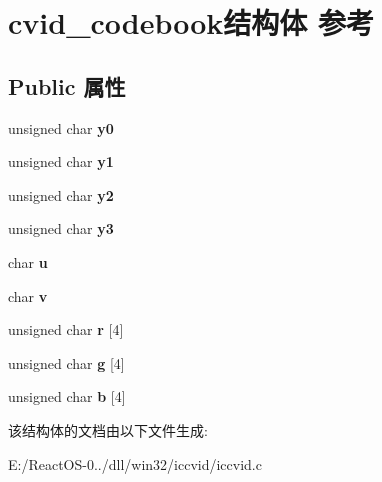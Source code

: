 \hypertarget{structcvid__codebook}{}\section{cvid\+\_\+codebook结构体 参考}
\label{structcvid__codebook}
\subsection*{Public 属性}
\begin{DoxyCompactItemize}
\item 
\mbox{\label{structcvid__codebook_a914ddd0c79baeb850d43d325d1bea298}} 
unsigned char {\bfseries y0}
\item 
\mbox{\label{structcvid__codebook_a2ea6977571cdccf45c3872c2b7aacb6f}} 
unsigned char {\bfseries y1}
\item 
\mbox{\label{structcvid__codebook_aa2315aa92d29d2389ec4a82062f8ce07}} 
unsigned char {\bfseries y2}
\item 
\mbox{\label{structcvid__codebook_a310139e31adedc6c40bb25f0b63f2086}} 
unsigned char {\bfseries y3}
\item 
\mbox{\label{structcvid__codebook_a4220073260219ac7181f433f8e0c952c}} 
char {\bfseries u}
\item 
\mbox{\label{structcvid__codebook_a55bae5f4f287fced976993eb42bac646}} 
char {\bfseries v}
\item 
\mbox{\label{structcvid__codebook_a1e7c7e57bf3e5704f1ca75b0cc61f57b}} 
unsigned char {\bfseries r} \mbox{[}4\mbox{]}
\item 
\mbox{\label{structcvid__codebook_af1c10cd460f11b904f232e5f2ede584c}} 
unsigned char {\bfseries g} \mbox{[}4\mbox{]}
\item 
\mbox{\label{structcvid__codebook_a6b0840f8ccc34cded3c8679d3df5a8c1}} 
unsigned char {\bfseries b} \mbox{[}4\mbox{]}
\end{DoxyCompactItemize}


该结构体的文档由以下文件生成\+:\begin{DoxyCompactItemize}
\item 
E\+:/\+React\+O\+S-\/0../dll/win32/iccvid/iccvid.\+c\end{DoxyCompactItemize}
